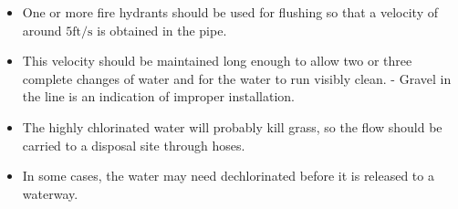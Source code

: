 \begin{enumerate}
\begin{itemize}
\item One or more fire hydrants should be used for flushing so that a velocity of around $5 \mathrm{ft} / \mathrm{s}$ is obtained in the pipe.
\item This velocity should be maintained long enough to allow two or three complete changes of water and for the water to run visibly clean. - Gravel in the line is an indication of improper installation.
\item The highly chlorinated water will probably kill grass, so the flow should be carried to a disposal site through hoses.
\item In some cases, the water may need dechlorinated before it is released to a waterway.

\end{itemize}

\end{enumerate}

